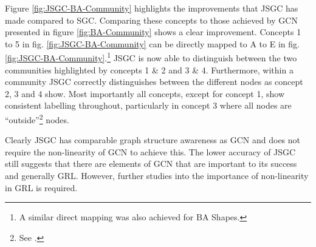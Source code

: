 Figure \ref{fig:JSGC-BA-Community} highlights the improvements that JSGC has made compared to SGC.
Comparing these concepts to those achieved by GCN presented in figure \ref{fig:BA-Community} shows a clear improvement.
Concepts 1 to 5 in fig. \ref{fig:JSGC-BA-Community} can be directly mapped to A to E in fig. \ref{fig:JSGC-BA-Community}.\footnote{A similar direct mapping was also achieved for BA Shapes.}
JSGC is now able to distinguish between the two communities highlighted by concepts 1 \& 2 and 3 \& 4.
Furthermore, within a community JSGC correctly distinguishes between the different nodes as concept 2, 3 and 4 show.
Most importantly all concepts, except for concept 1, show consistent labelling throughout, particularly in concept 3 where all nodes are ``outside''\footnote{See .} nodes.

Clearly JSGC has comparable graph structure awareness as GCN and does not require the non-linearity of GCN to achieve this.
The lower accuracy of JSGC still suggests that there are elements of GCN that are important to its success and generally GRL.
However, further studies into the importance of non-linearity in GRL is required.
